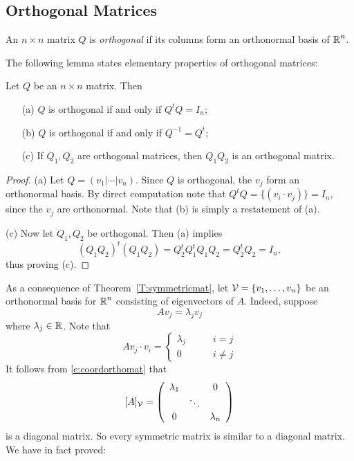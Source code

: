 \documentclass{ximera}
\begin{document}
\subsection*{Orthogonal Matrices}

\begin{definition} \label{def:orthmat}
An $n\times n$ matrix $Q$ is {\em orthogonal\/} if its columns form an
orthonormal basis
of $\mbox{$\Bbb{R}$}^n$.
\end{definition}



The following lemma states elementary properties of orthogonal matrices:
\begin{lemma} \label{lem:orthprop}
Let $Q$ be an $n\times n$ matrix.  Then
\begin{itemize}
\item[(a)] $Q$ is orthogonal if and only if $Q^tQ=I_n$;
\item[(b)] $Q$ is orthogonal if and only if $Q^{-1} = Q^t$;
\item[(c)] If $Q_1,Q_2$ are orthogonal matrices, then $Q_1Q_2$ is
an orthogonal matrix.
\end{itemize}
\end{lemma}
\begin{proof}  (a) Let $Q=(v_1|\cdots|v_n)$.  Since $Q$ is orthogonal, the $v_j$
form an orthonormal basis.  By direct computation note that
$Q^tQ=\{(v_i\cdot v_j)\}=I_n$, since the $v_j$ are orthonormal. Note that
(b) is simply a restatement of (a).

\noindent (c) Now let $Q_1,Q_2$ be orthogonal. Then (a) implies
\[
(Q_1Q_2)^t(Q_1Q_2) = Q_2^tQ_1^tQ_1Q_2 = Q_2^tQ_2 = I_n,
\]
thus proving (c).  \end{proof}

As a consequence of Theorem~\ref{T:symmetricmat}, let
${\cal V}=\{v_1,\ldots,v_n\}$ be an orthonormal basis for $\mbox{$\Bbb{R}$}^n$
consisting of eigenvectors of $A$.  Indeed, suppose
\[
Av_j = \lambda_jv_j
\]
where $\lambda_j\in\mbox{$\Bbb{R}$}$.  Note that
\[
Av_j\cdot v_i =  \left\{\begin{array}{rl} \lambda_j & \qquad i=j\\
			0 & \qquad i\neq j \end{array}\right.
\]
It follows from \eqref{e:coordorthomat} that
\[
[A]_{\cal V}= \left(\begin{array}{ccc} \lambda_1 & & 0 \\  & \ddots & \\
	0 &  & \lambda_n \end{array}\right)
\]
is a diagonal matrix.  So every symmetric matrix is similar to a diagonal
matrix.  We have in fact proved:
\end{document}
